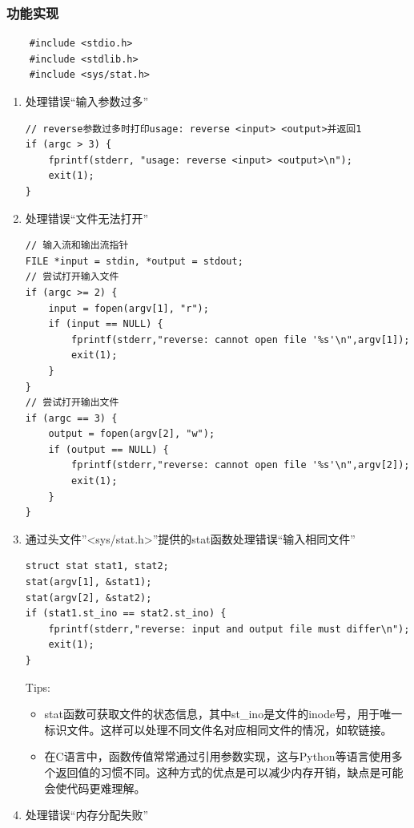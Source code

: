 \documentclass[fontset=ubuntu]{ctexart}
\begin{document}
\subsubsection{功能实现}

\begin{lstlisting}
    #include <stdio.h>
    #include <stdlib.h>
    #include <sys/stat.h>
\end{lstlisting}

\begin{enumerate}
    \item 处理错误“输入参数过多”
          \begin{lstlisting}
// reverse参数过多时打印usage: reverse <input> <output>并返回1
if (argc > 3) {
    fprintf(stderr, "usage: reverse <input> <output>\n");
    exit(1);
}	
    \end{lstlisting}
    \item 处理错误“文件无法打开”
          \begin{lstlisting}
// 输入流和输出流指针
FILE *input = stdin, *output = stdout;
// 尝试打开输入文件
if (argc >= 2) {
    input = fopen(argv[1], "r");
    if (input == NULL) {
        fprintf(stderr,"reverse: cannot open file '%s'\n",argv[1]);
        exit(1);
    }
}
// 尝试打开输出文件
if (argc == 3) {
    output = fopen(argv[2], "w");
    if (output == NULL) {
        fprintf(stderr,"reverse: cannot open file '%s'\n",argv[2]);
        exit(1);
    }
}
          \end{lstlisting}
    \item 通过头文件”<sys/stat.h>”提供的stat函数处理错误“输入相同文件”
          \begin{lstlisting}
struct stat stat1, stat2;
stat(argv[1], &stat1);
stat(argv[2], &stat2);
if (stat1.st_ino == stat2.st_ino) {
    fprintf(stderr,"reverse: input and output file must differ\n");
    exit(1);
}
    \end{lstlisting}
          \noindent Tips:
          \vspace{-0.3cm}
          \begin{itemize}
              \item stat函数可获取文件的状态信息，其中st\_ino是文件的inode号，用于唯一标识文件。这样可以处理不同文件名对应相同文件的情况，如软链接。
              \item 在C语言中，函数传值常常通过引用参数实现，这与Python等语言使用多个返回值的习惯不同。这种方式的优点是可以减少内存开销，缺点是可能会使代码更难理解。
          \end{itemize}
    \item 处理错误“内存分配失败”

\end{enumerate}
\end{document}
